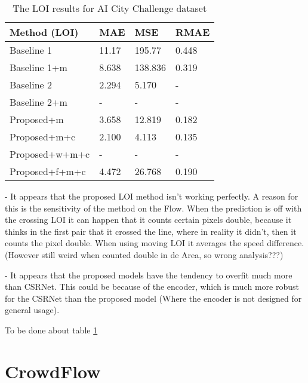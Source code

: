 \begin{table}[!htb]
	\begin{minipage}{.5\linewidth}
      \centering
		\begin{tabular}{llll}
		\hline
		Method (LOI)                               & MAE & MSE & RMAE \\ \hline
		\multicolumn{1}{l|}{Baseline 1}          & 11.17 & 195.77 & 0.448 \\
		\multicolumn{1}{l|}{Baseline 1+m}          & 8.638 & 138.836 & 0.319 \\
		\multicolumn{1}{l|}{Baseline 2}          & 2.294 & 5.170 & - \\
		\multicolumn{1}{l|}{Baseline 2+m}      & - & - & - \\
		\multicolumn{1}{l|}{Proposed+m}        	 & 3.658 & 12.819 & 0.182 \\
		\multicolumn{1}{l|}{Proposed+m+c}        & 2.100 & 4.113 & 0.135 \\
		\multicolumn{1}{l|}{Proposed+w+m+c}        & - & - & - \\
		\multicolumn{1}{l|}{Proposed+f+m+c}        & 4.472 & 26.768 & 0.190 \\ \hline
		\end{tabular}
		\caption{\label{tab:loi_aicity}The LOI results for AI City Challenge dataset}
	\end{minipage}
\end{table}


- It appears that the proposed LOI method isn't working perfectly. A reason for this is the sensitivity of the method on the Flow. When the prediction is off with the crossing LOI it can happen that it counts certain pixels double, because it thinks in the first pair that it crossed the line, where in reality it didn't, then it counts the pixel double. When using moving LOI it averages the speed difference. (However still weird when counted double in de Area, so wrong analysis???)

- It appears that the proposed models have the tendency to overfit much more than CSRNet. This could be because of the encoder, which is much more robust for the CSRNet than the proposed model (Where the encoder is not designed for general usage).

To be done about table \ref{tab:loi_aicity}


\section{CrowdFlow}

